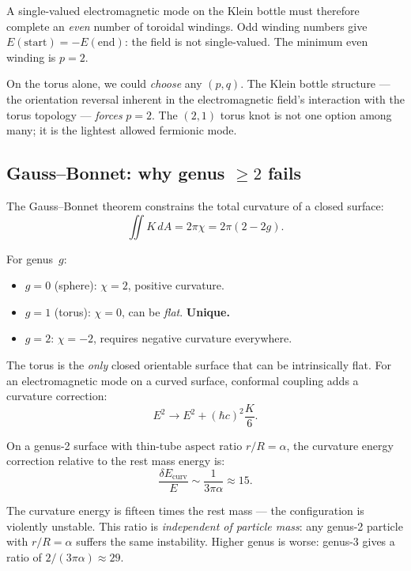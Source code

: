\documentclass[11pt,a4paper]{article}
\begin{document}
A single-valued electromagnetic mode on the Klein bottle must therefore complete an \emph{even} number of toroidal windings. Odd winding numbers give $E(\text{start}) = -E(\text{end})$: the field is not single-valued. The minimum even winding is $p = 2$.

On the torus alone, we could \emph{choose} any $(p,q)$. The Klein bottle structure --- the orientation reversal inherent in the electromagnetic field's interaction with the torus topology --- \emph{forces} $p = 2$. The $(2,1)$ torus knot is not one option among many; it is the lightest allowed fermionic mode.

\subsection{Gauss--Bonnet: why genus \texorpdfstring{$\geq 2$}{>= 2} fails}

The Gauss--Bonnet theorem constrains the total curvature of a closed surface:
\begin{equation}
  \iint K\, dA = 2\pi\chi = 2\pi(2 - 2g).
  \label{eq:gauss-bonnet}
\end{equation}

For genus~$g$:
\begin{itemize}
  \item $g = 0$ (sphere): $\chi = 2$, positive curvature.
  \item $g = 1$ (torus): $\chi = 0$, can be \emph{flat}. \textbf{Unique.}
  \item $g = 2$: $\chi = -2$, requires negative curvature everywhere.
\end{itemize}

The torus is the \emph{only} closed orientable surface that can be intrinsically flat. For an electromagnetic mode on a curved surface, conformal coupling adds a curvature correction:
\begin{equation}
  E^2 \to E^2 + (\hbar c)^2 \frac{K}{6}.
  \label{eq:conformal-coupling}
\end{equation}

On a genus-2 surface with thin-tube aspect ratio $r/R = \alpha$, the curvature energy correction relative to the rest mass energy is:
\begin{equation}
  \frac{\delta E_{\text{curv}}}{E} \sim \frac{1}{3\pi\alpha} \approx 15.
  \label{eq:curvature-ratio}
\end{equation}

The curvature energy is fifteen times the rest mass --- the configuration is violently unstable. This ratio is \emph{independent of particle mass}: any genus-2 particle with $r/R = \alpha$ suffers the same instability. Higher genus is worse: genus-3 gives a ratio of $2/(3\pi\alpha) \approx 29$.
\end{document}

